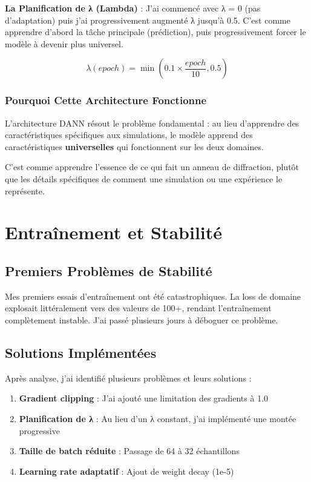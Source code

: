 \documentclass[11pt,a4paper]{article}
\begin{document}
\begin{conceptbox}
\textbf{La Planification de λ (Lambda)} : J'ai commencé avec λ = 0 (pas d'adaptation) puis j'ai progressivement augmenté λ jusqu'à 0.5. C'est comme apprendre d'abord la tâche principale (prédiction), puis progressivement forcer le modèle à devenir plus universel.

$$\lambda(epoch) = \min\left(0.1 \times \frac{epoch}{10}, 0.5\right)$$
\end{conceptbox}

\subsubsection{Pourquoi Cette Architecture Fonctionne}

L'architecture DANN résout le problème fondamental : au lieu d'apprendre des caractéristiques spécifiques aux simulations, le modèle apprend des caractéristiques \textbf{universelles} qui fonctionnent sur les deux domaines.

C'est comme apprendre l'essence de ce qui fait un anneau de diffraction, plutôt que les détails spécifiques de comment une simulation ou une expérience le représente.

\section{Entraînement et Stabilité}

\subsection{Premiers Problèmes de Stabilité}

Mes premiers essais d'entraînement ont été catastrophiques. La loss de domaine explosait littéralement vers des valeurs de 100+, rendant l'entraînement complètement instable. J'ai passé plusieurs jours à déboguer ce problème.

\subsection{Solutions Implémentées}

Après analyse, j'ai identifié plusieurs problèmes et leurs solutions :

\begin{enumerate}
    \item \textbf{Gradient clipping} : J'ai ajouté une limitation des gradients à 1.0
    \item \textbf{Planification de λ} : Au lieu d'un λ constant, j'ai implémenté une montée progressive
    \item \textbf{Taille de batch réduite} : Passage de 64 à 32 échantillons
    \item \textbf{Learning rate adaptatif} : Ajout de weight decay (1e-5)
\end{enumerate}
\end{document}
